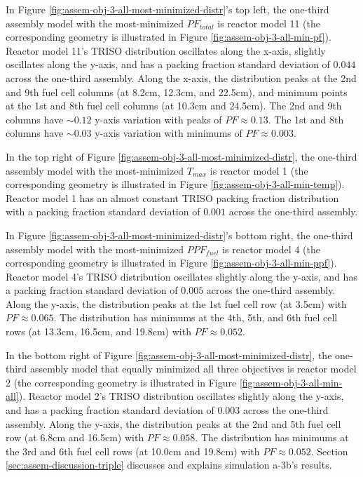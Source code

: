 In Figure \ref{fig:assem-obj-3-all-most-minimized-distr}'s top left, the 
one-third assembly model with the most-minimized $PF_{total}$ is reactor model 11 
(the corresponding geometry is illustrated in Figure \ref{fig:assem-obj-3-all-min-pf}). 
Reactor model 11's TRISO distribution oscillates along the x-axis, slightly 
oscillates along the y-axis, and has a packing fraction standard deviation of 
$0.044$ across the one-third assembly. 
Along the x-axis, the distribution peaks at the 2nd and 9th fuel cell columns 
(at 8.2cm, 12.3cm, and 22.5cm), and minimum points at the 1st and 8th fuel cell 
columns (at 10.3cm and 24.5cm).
The 2nd and 9th columns have ${\sim}0.12$ y-axis variation with peaks of 
$PF\approx0.13$. 
The 1st and 8th columns have ${\sim}0.03$ y-axis variation with minimums of 
$PF\approx0.003$. 

In the top right of Figure \ref{fig:assem-obj-3-all-most-minimized-distr}, the 
one-third assembly model with the most-minimized $T_{max}$ is reactor model 1 
(the corresponding geometry is illustrated in Figure \ref{fig:assem-obj-3-all-min-temp}). 
Reactor model 1 has an almost constant TRISO packing fraction distribution with 
a packing fraction standard deviation of $0.001$ across the one-third assembly. 

In Figure \ref{fig:assem-obj-3-all-most-minimized-distr}'s bottom right, the 
one-third assembly model with the most-minimized $PPF_{fuel}$ is reactor model 4 
(the corresponding geometry is illustrated in Figure \ref{fig:assem-obj-3-all-min-ppf}). 
Reactor model 4's TRISO distribution oscillates slightly along the y-axis, and has a 
packing fraction standard deviation of $0.005$ across the one-third assembly. 
Along the y-axis, the distribution peaks at the 1st fuel cell row (at 3.5cm) with 
$PF\approx0.065$. 
The distribution has minimums at the 4th, 5th, and 6th fuel cell rows (at 13.3cm, 
16.5cm, and 19.8cm) with $PF\approx0.052$.

In the bottom right of Figure \ref{fig:assem-obj-3-all-most-minimized-distr}, the 
one-third assembly model that equally minimized all three objectives is reactor 
model 2 (the corresponding geometry is illustrated in Figure 
\ref{fig:assem-obj-3-all-min-all}).  
Reactor model 2's TRISO distribution oscillates slightly along the y-axis, and has a 
packing fraction standard deviation of $0.003$ across the one-third assembly.
Along the y-axis, the distribution peaks at the 2nd and 5th fuel cell row 
(at 6.8cm and 16.5cm) with $PF\approx0.058$. 
The distribution has minimums at the 3rd and 6th fuel cell rows (at 10.0cm and 19.8cm) 
with $PF\approx0.052$.
Section \ref{sec:assem-discussion-triple} discusses and explains simulation a-3b's 
results.


